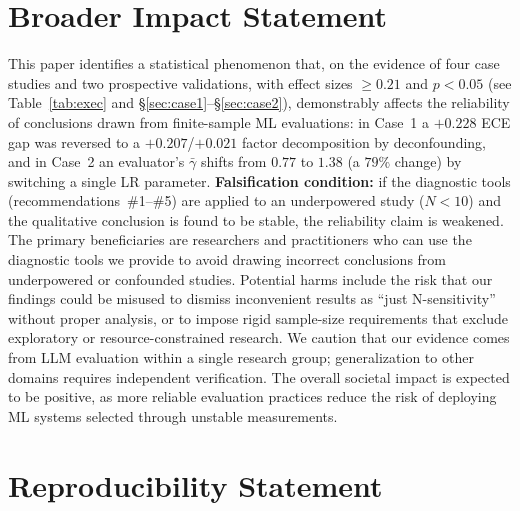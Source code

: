 \documentclass[11pt]{article}
\begin{document}
\section*{Broader Impact Statement}

This paper identifies a statistical phenomenon that, on the evidence of four case studies and two prospective validations, with effect sizes $\geq 0.21$ and $p<0.05$ (see Table~\ref{tab:exec} and \S\ref{sec:case1}--\S\ref{sec:case2}), demonstrably affects the reliability of conclusions drawn from finite-sample ML evaluations: in Case~1 a $+0.228$ ECE gap was reversed to a $+0.207$/$+0.021$ factor decomposition by deconfounding, and in Case~2 an evaluator's $\bar{\gamma}$ shifts from $0.77$ to $1.38$ (a $79\%$ change) by switching a single LR parameter. \textbf{Falsification condition:} if the diagnostic tools (recommendations~\#1--\#5) are applied to an underpowered study ($N<10$) and the qualitative conclusion is found to be stable, the reliability claim is weakened. The primary beneficiaries are researchers and practitioners who can use the diagnostic tools we provide to avoid drawing incorrect conclusions from underpowered or confounded studies. Potential harms include the risk that our findings could be misused to dismiss inconvenient results as ``just N-sensitivity'' without proper analysis, or to impose rigid sample-size requirements that exclude exploratory or resource-constrained research. We caution that our evidence comes from LLM evaluation within a single research group; generalization to other domains requires independent verification. The overall societal impact is expected to be positive, as more reliable evaluation practices reduce the risk of deploying ML systems selected through unstable measurements.

\section*{Reproducibility Statement}
\end{document}
